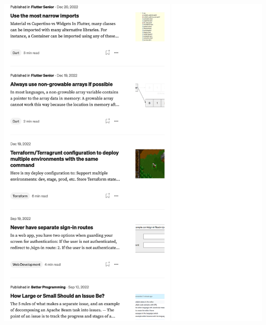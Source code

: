 \Continuing
\begin{center}
    \includegraphics[width=40em]{medium-articles-p7}
\end{center}
\WillContinue
\pagebreak


